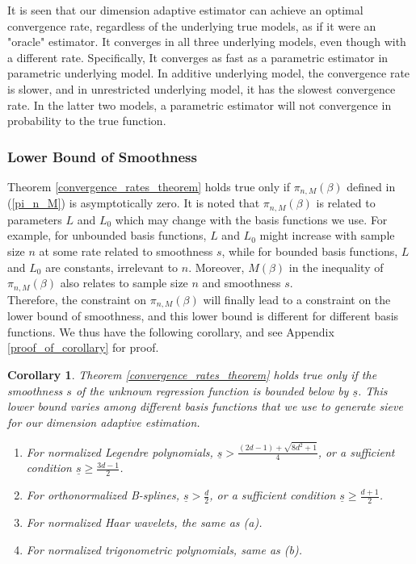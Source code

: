 \documentclass[12pt, a4paper]{article}
\theoremstyle{MAstyle} \newtheorem{assumption}{Assumption}[section]
\theoremstyle{MAstyle} \newtheorem{definition}{Definition}[section]
\theoremstyle{MAstyle} \newtheorem{theorem}{Theorem}[section]
\theoremstyle{MAstyle} \newtheorem{corollary}{Corollary}[section]
\begin{document}
                    It is seen that our dimension adaptive estimator can achieve an optimal convergence rate, regardless of the underlying true models, as if it were an "oracle" estimator. It converges in all three underlying models, even though with a different rate. Specifically, It converges as fast as a parametric estimator in parametric underlying model. In additive underlying model, the convergence rate is slower, and in unrestricted underlying model, it has the slowest convergence rate. In the latter two models, a parametric estimator will not convergence in probability to the true function.

                    \subsubsection{Lower Bound of Smoothness}\label{lower_bound_smoothness}
                    Theorem \ref{convergence_rates_theorem} holds true only if $\pi_{n,M}(\beta)$ defined in (\ref{pi_n_M}) is asymptotically zero. It is noted that $\pi_{n,M}(\beta)$ is related to parameters $L$ and $L_0$ which may change with the basis functions we use. For example, for unbounded basis functions, $L$ and $L_0$ might increase with sample size $n$ at some rate related to smoothness $s$, while for bounded basis functions, $L$ and $L_0$ are constants, irrelevant to $n$. Moreover, $M(\beta)$ in the inequality of $\pi_{n,M}(\beta)$ also relates to sample size $n$ and smoothness $s$. \\
                    
                    Therefore, the constraint on $\pi_{n,M}(\beta)$ will finally lead to a constraint on the lower bound of smoothness, and this lower bound is different for different basis functions. We thus have the following corollary, and see Appendix \ref{proof_of_corollary} for proof.
                    \begin{corollary}\label{smoothness_corollary}
                        Theorem \ref{convergence_rates_theorem} holds true only if the smoothness $s$ of the unknown regression function is bounded below by $\underline{s}$. This lower bound varies among different basis functions that we use to generate sieve for our dimension adaptive estimation. 
                        \begin{enumerate}[label=(\alph*), noitemsep]
                            \item For normalized Legendre polynomials, $\underline{s} > \frac{(2d-1)+\sqrt{8d^2+1}}{4}$, or a sufficient condition $\underline{s} \ge \frac{3d-1}{2}$.
                            \item For orthonormalized B-splines, $\underline{s}>\frac{d}{2}$, or a sufficient condition $\underline{s}\ge \frac{d+1}{2}$.
                            \item For normalized Haar wavelets, the same as (a).
                            \item For normalized trigonometric polynomials, same as (b).   
                        \end{enumerate}
                    \end{corollary}
\end{document}
